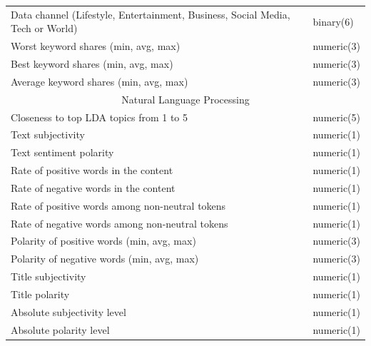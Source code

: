\documentclass[11pt]{article}
\begin{document}
\begin{table}[h]
\begin{tabular}{ l | l }
            Data channel (Lifestyle, Entertainment, Business, Social Media, Tech or World) & binary(6) \\
            Worst keyword shares (min, avg, max) & numeric(3) \\
            Best keyword shares (min, avg, max) & numeric(3) \\
            Average keyword shares (min, avg, max) & numeric(3) \\
            \hline
            \multicolumn{2}{c}{Natural Language Processing}\\
            \hline
            Closeness to top LDA topics from 1 to 5 & numeric(5) \\
            Text subjectivity & numeric(1) \\
            Text sentiment polarity & numeric(1) \\
            Rate of positive words in the content & numeric(1) \\
            Rate of negative words in the content & numeric(1) \\
            Rate of positive words among non-neutral tokens & numeric(1) \\
            Rate of negative words among non-neutral tokens & numeric(1) \\
            Polarity of positive words (min, avg, max) & numeric(3) \\
            Polarity of negative words (min, avg, max) & numeric(3) \\
            Title subjectivity & numeric(1) \\
            Title polarity & numeric(1) \\
            Absolute subjectivity level & numeric(1) \\
            Absolute polarity level & numeric(1) \\
            \hline\hline
        \end{tabular}
        \label{table:1}
    \end{table}

{}

\end{document}
